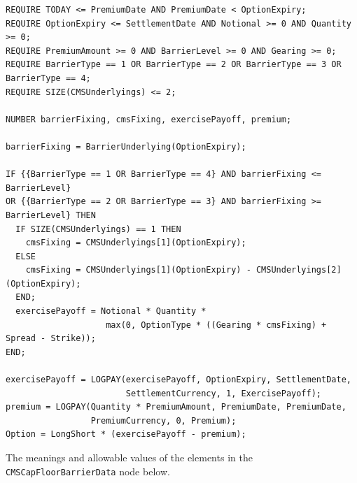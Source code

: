 \begin{listing}[hbt]
\begin{verbatim}
REQUIRE TODAY <= PremiumDate AND PremiumDate < OptionExpiry;
REQUIRE OptionExpiry <= SettlementDate AND Notional >= 0 AND Quantity >= 0;
REQUIRE PremiumAmount >= 0 AND BarrierLevel >= 0 AND Gearing >= 0;
REQUIRE BarrierType == 1 OR BarrierType == 2 OR BarrierType == 3 OR BarrierType == 4;
REQUIRE SIZE(CMSUnderlyings) <= 2;

NUMBER barrierFixing, cmsFixing, exercisePayoff, premium;

barrierFixing = BarrierUnderlying(OptionExpiry);

IF {{BarrierType == 1 OR BarrierType == 4} AND barrierFixing <= BarrierLevel}
OR {{BarrierType == 2 OR BarrierType == 3} AND barrierFixing >= BarrierLevel} THEN
  IF SIZE(CMSUnderlyings) == 1 THEN
    cmsFixing = CMSUnderlyings[1](OptionExpiry);
  ELSE
    cmsFixing = CMSUnderlyings[1](OptionExpiry) - CMSUnderlyings[2](OptionExpiry);
  END;
  exercisePayoff = Notional * Quantity *
                    max(0, OptionType * ((Gearing * cmsFixing) + Spread - Strike));
END;

exercisePayoff = LOGPAY(exercisePayoff, OptionExpiry, SettlementDate,
                        SettlementCurrency, 1, ExercisePayoff);
premium = LOGPAY(Quantity * PremiumAmount, PremiumDate, PremiumDate,
                 PremiumCurrency, 0, Premium);
Option = LongShort * (exercisePayoff - premium);
\end{verbatim}
\caption{Payoff script for a CMS Cap / Floor with FX Barrier.}
\label{lst:cms_capfloor_barrier}
\end{listing}

The meanings and allowable values of the elements in the \lstinline!CMSCapFloorBarrierData! node below.

